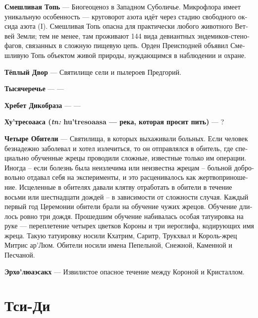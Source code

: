 \documentclass[a4paper,12pt,fleqn]{book}\usepackage{polyglossia}\setdefaultlanguage[babelshorthands=true]{russian}\setotherlanguage{english}\defaultfontfeatures{Ligatures=TeX,Mapping=tex-text}\usepackage{xcolor}\newcommand{\ml}[3]{#2}
\newcommand{\theterm}[3]{\textbf{\hypertarget{#1}{#2}} --- #3}
\newcommand{\theorigin}[3]{\textit{#1:} #2 --- #3}
\begin{document}
\theterm{risible-swamp}
{Смешливая Топь}
{Биогеоценоз в Западном Суболичье.
Микрофлора имеет уникальную особенность --- круговорот азота идёт через стадию свободного оксида азота (I).
Смешливая Топь опасна для практически любого животного Ветвей Земли;
тем не менее, там проживают 144 вида девиантных эндемиков-стенофагов, связанных в сложную пищевую цепь.
Орден Преисподней объявил Смешливую Топь объектом живой природы, нуждающимся в наблюдении и охране.}

\theterm{sanct2}
{Тёплый Двор}
{Святилище сели и пылероев Предгорий.}

\theterm{rivertangle}
{Тысячеречье}
{---}

\theterm{hedgehog-spine}
{Хребет Дикобраза}
{---}

\theterm{hu-tresoaasa}
{Ху'тресоааса (\theorigin{tn}{hu'tresoaasa}{река, которая просит пить})}
{?}

\theterm{abode}
{Четыре Обители}
{Святилища, в которых выхаживали больных.
Если человек безнадежно заболевал и хотел излечиться, то он отправлялся в обитель, где специально обученные жрецы проводили сложные, известные только им операции.
Иногда -- если болезнь была неизлечима или неизвестна жрецам -- больной добровольно отдавал себя на эксперименты, и это расценивалось как жертвоприношение.
Исцеленные в обителях давали клятву отработать в обители в течение восьми или шестнадцати дождей -- в зависимости от сложности случая.
Каждый первый год Церемонии обители брали на обучение чужих жрецов.
Обучение длилось ровно три дождя.
Прошедшим обучение набивалась особая татуировка на руке --- переплетение четырех цветков Короны и три иероглифа, кодирующих имя жреца.
Такую татуировку носили Кхатрим, Саритр, Трукхвал и Король-жрец Митрис ар'Люм.
Обители носили имена Пепельной, Снежной, Каменной и Песчаной.}

\theterm{oerho-loeaesakch}
{Эрхо'люаэсакх}
{Извилистое опасное течение между Короной и Кристаллом.}

\section{Тси-Ди}
\end{document}
